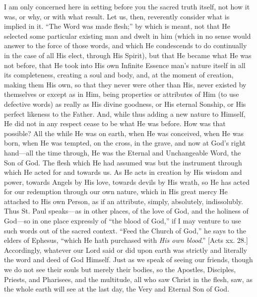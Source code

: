 I am only concerned here in setting before you the sacred truth
itself, not how it was, or why, or with what result. Let us, then,
reverently consider what is implied in it. ``The Word was made
flesh;'' by which is meant, not that He selected some particular
existing man and dwelt in him (which in no sense would answer to the
force of those words, and which He condescends to do continually in
the case of all His elect, through His Spirit), but that He became
what He was not before, that He took into His own Infinite Essence
man's nature itself in all its completeness, creating a soul and body,
and, at the moment of creation, making them His own, so that they
never were other than His, never existed by themselves or except as in
Him, being properties or attributes of Him (to use defective words) as
really as His divine goodness, or His eternal Sonship, or His perfect
likeness to the Father. And, while thus adding a new nature to
Himself, He did not in any respect cease to be what He was before. How
was that possible? All the while He was on earth, when He was
conceived, when He was born, when He was tempted, on the cross, in the
grave, and now at God's right hand—all the time through, He was the
Eternal and Unchangeable Word, the Son of God. The flesh which He had
assumed was but the instrument through which He acted for and towards
us. As He acts in creation by His wisdom and power, towards Angels by
His love, towards devils by His wrath, so He has acted for our
redemption through our own nature, which in His great mercy He
attached to His own Person, as if an attribute, simply, absolutely,
indissolubly. Thus St. Paul speaks—as in other places, of the love
of God, and the holiness of God—so in one place expressly of
``the blood of God,'' if I may venture to use such words out
of the sacred context. ``Feed the Church of God,'' he says to
the elders of Ephesus, ``which He hath purchased with \emph{His own
blood}.'' [Acts xx. 28.] Accordingly, whatever our Lord said or
did upon earth was strictly and literally the word and deed of God
Himself. Just as we speak of seeing our friends, though we do not see
their souls but merely their bodies, so the Apostles, Disciples,
Priests, and Pharisees, and the multitude, all who saw Christ in the
flesh, saw, as the whole earth will see at the last day, the Very and
Eternal Son of God.


